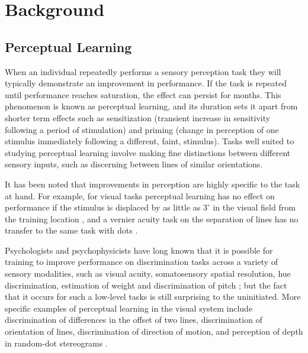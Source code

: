 \section{Background}
\label{ch:bg}

\subsection{Perceptual Learning}
\label{sec:bgpl}

When an individual repeatedly performs a sensory perception task they will typically demonstrate an improvement in performance. If the task is repeated until performance reaches saturation, the effect can persist for months. This phenomenon is known as perceptual learning, and its duration sets it apart from shorter term effects such as sensitization (transient increase in sensitivity following a period of stimulation) and priming (change in perception of one stimulus immediately following a different, faint, stimulus).
Tasks well suited to studying perceptual learning involve making fine distinctions between different sensory inputs, such as discerning between lines of similar orientations.

It has been noted that improvements in perception are highly specific to the task at hand. For example, for visual tasks perceptual learning has no effect on performance if the stimulus is displaced by as little as $3^\circ$ in the visual field from the training location \cite{Gilbert1994}, 
and a vernier acuity task on the separation of lines has no transfer to the same task with dots \cite{Poggio1992}.


Psychologists and psychophysicists have long known that it is possible for training to improve performance on discrimination tasks across a variety of sensory modalities, such as visual acuity, somatosensory spatial resolution, hue discrimination, estimation of weight and discrimination of pitch \cite{Gilbert2001}; but the fact that it occurs for such a low-level tasks is still surprising to the uninitiated. More specific examples of perceptual learning in the visual system include discrimination of differences in the offset of two lines, discrimination of orientation of lines, discrimination of direction of motion, and perception of depth in random-dot stereograms \cite{Gilbert2001,Fine2002}.

